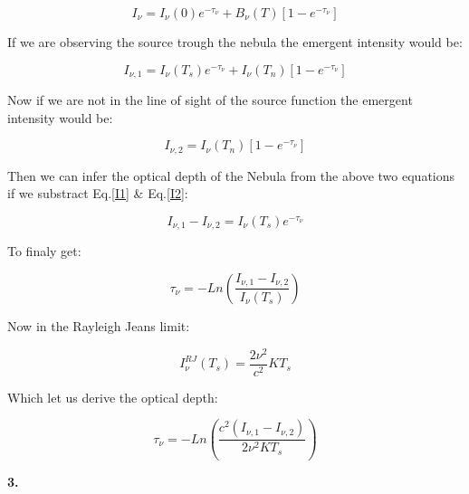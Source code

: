 \documentclass[12pt]{article}
\begin{document}
\begin{equation}
I_{\nu} = I_{\nu}(0)e^{-\tau_{\nu}} + B_{\nu}(T)\left[ 1 - e^{-\tau_{\nu}} \right]
\end{equation}

If we are observing the source trough the nebula the emergent intensity would be:

\begin{equation}\label{I1}
I_{\nu, 1 } = I_{\nu}(T_s)e^{-\tau_{\nu}} + I_{\nu}(T_n)\left[ 1 - e^{-\tau_{\nu}} \right]
\end{equation}

Now if we are not in the line of sight of the source function the emergent
intensity would be:

\begin{equation}\label{I2}
I_{\nu, 2} = I_{\nu}(T_n)\left[ 1 - e^{-\tau_{\nu}} \right]
\end{equation}

Then we can infer the optical depth of the Nebula from the above two 
equations if we substract Eq.\ref{I1} \& Eq.\ref{I2}:

\begin{equation}
I_{\nu, 1} - I_{\nu, 2} = I_{\nu}(T_s)e^{-\tau_{\nu}}
\end{equation}

To finaly get:

\begin{equation}
\tau_{\nu} = -Ln \left( \dfrac{I_{\nu, 1} - I_{\nu, 2}}{I_{\nu}(T_s)}  \right)
\end{equation}

Now in the Rayleigh Jeans limit: 

\begin{equation}
I_{\nu}^{RJ} (T_s) = \dfrac{2\nu^2}{c^2}KT_s
\end{equation}

Which let us derive the optical depth:

\begin{equation}
\tau_{\nu} = -Ln \left( \dfrac{c^2(I_{\nu, 1} - I_{\nu, 2})}{2\nu^2 KT_s}  \right)
\end{equation}



\begin{LARGE}
\textbf{3.}
\end{LARGE}
\end{document}
